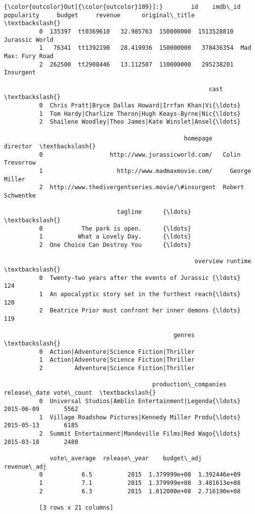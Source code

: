 \documentclass[11pt]{article}
\begin{document}
\begin{Verbatim}[commandchars=\\\{\}]
{\color{outcolor}Out[{\color{outcolor}109}]:}        id    imdb\_id  popularity     budget     revenue      original\_title  \textbackslash{}
          0  135397  tt0369610   32.985763  150000000  1513528810      Jurassic World   
          1   76341  tt1392190   28.419936  150000000   378436354  Mad Max: Fury Road   
          2  262500  tt2908446   13.112507  110000000   295238201           Insurgent   
          
                                                          cast  \textbackslash{}
          0  Chris Pratt|Bryce Dallas Howard|Irrfan Khan|Vi{\ldots}   
          1  Tom Hardy|Charlize Theron|Hugh Keays-Byrne|Nic{\ldots}   
          2  Shailene Woodley|Theo James|Kate Winslet|Ansel{\ldots}   
          
                                                   homepage          director  \textbackslash{}
          0                   http://www.jurassicworld.com/   Colin Trevorrow   
          1                     http://www.madmaxmovie.com/     George Miller   
          2  http://www.thedivergentseries.movie/\#insurgent  Robert Schwentke   
          
                                tagline      {\ldots}       \textbackslash{}
          0           The park is open.      {\ldots}        
          1          What a Lovely Day.      {\ldots}        
          2  One Choice Can Destroy You      {\ldots}        
          
                                                      overview runtime  \textbackslash{}
          0  Twenty-two years after the events of Jurassic {\ldots}     124   
          1  An apocalyptic story set in the furthest reach{\ldots}     120   
          2  Beatrice Prior must confront her inner demons {\ldots}     119   
          
                                                genres  \textbackslash{}
          0  Action|Adventure|Science Fiction|Thriller   
          1  Action|Adventure|Science Fiction|Thriller   
          2         Adventure|Science Fiction|Thriller   
          
                                          production\_companies release\_date vote\_count  \textbackslash{}
          0  Universal Studios|Amblin Entertainment|Legenda{\ldots}   2015-06-09       5562   
          1  Village Roadshow Pictures|Kennedy Miller Produ{\ldots}   2015-05-13       6185   
          2  Summit Entertainment|Mandeville Films|Red Wago{\ldots}   2015-03-18       2480   
          
             vote\_average  release\_year    budget\_adj   revenue\_adj  
          0           6.5          2015  1.379999e+08  1.392446e+09  
          1           7.1          2015  1.379999e+08  3.481613e+08  
          2           6.3          2015  1.012000e+08  2.716190e+08  
          
          [3 rows x 21 columns]
\end{Verbatim}
            
\end{document}
